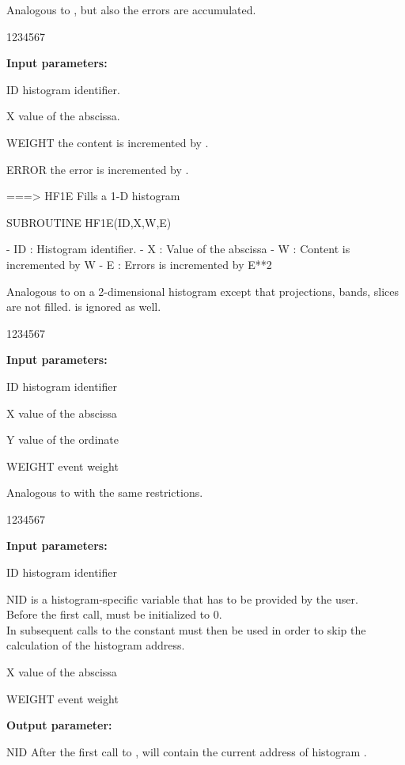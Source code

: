  
\Action Analogous to , but also the errors are accumulated.
 
\begin{DLtt}{1234567}
\item[{\rm\bf Input parameters:}]
\item[ID] histogram identifier.
\item[X] value of the abscissa.
\item[WEIGHT] the content is incremented by .
\item[ERROR] the error is incremented by .
\end{DLtt}
 

===>  HF1E Fills a 1-D histogram

      SUBROUTINE HF1E(ID,X,W,E)

      - ID : Histogram identifier.
      - X  : Value of the abscissa
      - W  : Content is incremented by W
      - E  : Errors is incremented by E**2


 
\Action 
Analogous to 
on a 2-dimensional histogram except that projections,
bands, slices are not filled. 
 is ignored as well.
 
\begin{DLtt}{1234567}
\item[{\rm\bf Input parameters:}]
\item[ID] histogram identifier
\item[X] value of the abscissa
\item[Y] value of the ordinate
\item[WEIGHT] event weight
\end{DLtt}
 
 
\Action 
Analogous to  with the same restrictions.
 
\begin{DLtt}{1234567}
\item[{\rm\bf Input parameters:}]
\item[ID]     histogram identifier
\item[NID]    is a histogram-specific variable that has to
              be provided by the user.\\
              Before the first call,  must be initialized to 0.\\
              In subsequent calls to  the constant
               must then be used in order
              to skip the calculation of the histogram address.
\item[X]      value of the abscissa
\item[WEIGHT] event weight
\item[{\rm\bf Output parameter:}]
\item[NID]    After the first call to ,
               will contain the current address
              of histogram .
\end{DLtt}
 

